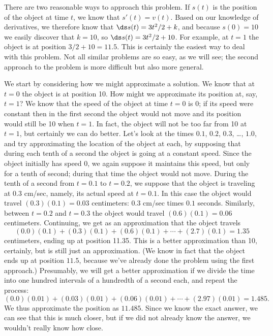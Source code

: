 \begin{solution} 
There are two reasonable ways to approach this problem. If $s(t)$ is
the position of the object at time $t$, we know that
$s'(t)=v(t)$. Based on our knowledge of derivatives, we
therefore know that $\ds s(t)=3t^2/2+k$, and because $s(0)=10$ we easily
discover that $k=10$, so $\ds s(t)=3t^2/2+10$. For example, at $t=1$ the
object is at position $3/2+10=11.5$.
This is certainly the easiest way to deal with this problem. Not all
similar problems are so easy, as we will see; the second approach to
the problem is more difficult but also more general.

We start by considering how we might approximate a solution. We know
that at $t=0$ the object is at position 10. How might we approximate
its position at, say, $t=1$? We know that the speed of the object at
time $t=0$ is $0$; if its speed were constant then in the first second
the object would not move and its position would still be 10 when
$t=1$. In fact, the object will not be too far from 10 at $t=1$, but
certainly we can do better. Let's look at the times $0.1$, $0.2$,
$0.3$, \dots, $1.0$, and try approximating the location of the object
at each, by supposing that during each tenth of a second the object is
going at a constant speed. Since the object initially has speed 0, we
again suppose it maintains this speed, but only for a tenth of second;
during that time the object would not move. During the tenth of a
second from $t=0.1$ to $t=0.2$, we suppose that the object is
traveling at $0.3$ cm/sec, namely, its actual speed at $t=0.1$. In
this case the object would travel $(0.3)(0.1)=0.03$ centimeters: $0.3$
cm/sec times $0.1$ seconds. Similarly, between $t=0.2$ and $t=0.3$ the
object would travel $(0.6)(0.1)=0.06$ centimeters.  Continuing, we get
as an approximation that the object travels
$$ 
  (0.0)(0.1)+(0.3)(0.1)+(0.6)(0.1)+\cdots+(2.7)(0.1)=1.35
$$ 
centimeters, ending up at position 11.35. This is a better
approximation than 10, certainly, but is still just an
approximation. (We know in fact that the object ends up at position
$11.5$, because we've already done the problem using the first
approach.) Presumably, we will get a better approximation if we divide
the time into one hundred intervals of a hundredth of a second each,
and repeat the process:
$$
  (0.0)(0.01)+(0.03)(0.01)+(0.06)(0.01)+\cdots+(2.97)(0.01)=1.485.
$$
We thus approximate the position as $11.485$. Since we know the exact
answer, we can see that this is much closer, but if we did not already
know the answer, we wouldn't really know how close.


\end{solution}
